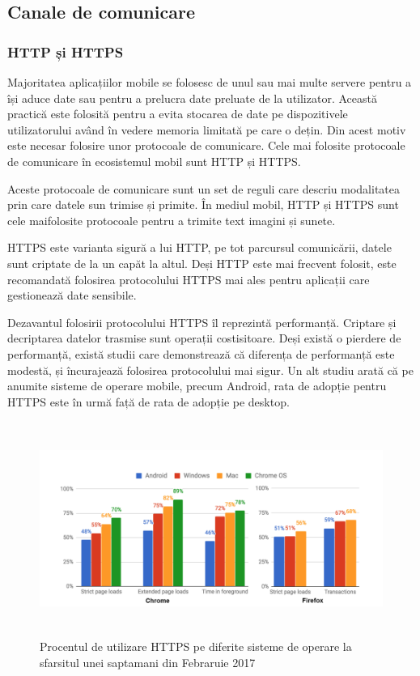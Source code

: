 \documentclass[12pt]{article}
\begin{document}
\newpage
\subsection{Canale de comunicare}
\subsubsection{HTTP și HTTPS}

Majoritatea aplicațiilor mobile se folosesc de unul sau mai multe servere pentru a își aduce date
sau pentru a prelucra date preluate de la utilizator. Această practică este folosită pentru a evita  stocarea de
date pe dispozitivele utilizatorului având în vedere memoria limitată pe care o dețin. Din acest motiv 
este necesar folosire unor protocoale de comunicare. Cele mai folosite protocoale de comunicare în ecosistemul
mobil sunt HTTP și HTTPS.

Aceste protocoale de comunicare sunt un set de reguli care descriu modalitatea prin care datele sun trimise și 
primite. În mediul mobil, HTTP și HTTPS sunt cele maifolosite protocoale pentru a trimite text imagini și sunete.

HTTPS este varianta sigură a lui HTTP, pe tot parcursul comunicării, datele sunt criptate de la un capăt la altul.
Deși HTTP este mai frecvent folosit, este recomandată folosirea protocolului HTTPS mai ales pentru aplicații 
care gestionează date sensibile.

Dezavantul folosirii protocolului HTTPS îl reprezintă performanță. Criptare și decriptarea datelor trasmise sunt
operații costisitoare. Deși există o pierdere de performanță, există studii \cite{goldberg1998comparison} care demonstrează
că diferența de performanță este modestă, și încurajează folosirea protocolului mai sigur. Un alt studiu \cite{felt2017measuring}
arată că pe anumite sisteme de operare mobile, precum Android, rata de adopție pentru HTTPS este în urmă față de rata de adopție
pe desktop. 

\begin{figure}[H]
\centering
\includegraphics[width=15cm, height=7cm]{http.png}
\caption{Procentul de utilizare HTTPS pe diferite sisteme de operare la sfarsitul unei saptamani din
Febraruie 2017 \cite{felt2017measuring}}
\end{figure}
\end{document}
